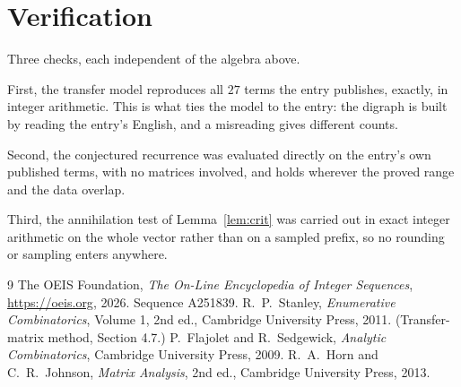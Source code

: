 \documentclass[11pt,a4paper]{article}
\theoremstyle{plain}
\theoremstyle{definition}
\begin{document}
\section{Verification}

Three checks, each independent of the algebra above.

First, the transfer model reproduces all $27$ terms the entry publishes, exactly, in
integer arithmetic. This is what ties the model to the entry: the digraph is built by reading
the entry's English, and a misreading gives different counts.

Second, the conjectured recurrence was evaluated directly on the entry's own published terms,
with no matrices involved, and holds wherever the proved range and the data overlap.

Third, the annihilation test of Lemma~\ref{lem:crit} was carried out in exact integer
arithmetic on the whole vector rather than on a sampled prefix, so no rounding or sampling
enters anywhere.

\begin{thebibliography}{9}
 The OEIS Foundation, \emph{The On-Line Encyclopedia of Integer
Sequences}, \url{https://oeis.org}, 2026. Sequence A251839.
 R.~P.~Stanley, \emph{Enumerative Combinatorics}, Volume 1, 2nd ed.,
Cambridge University Press, 2011. (Transfer-matrix method, Section 4.7.)
 P.~Flajolet and R.~Sedgewick, \emph{Analytic Combinatorics}, Cambridge
University Press, 2009.
 R.~A.~Horn and C.~R.~Johnson, \emph{Matrix Analysis}, 2nd ed., Cambridge
University Press, 2013.
\end{thebibliography}
\end{document}

